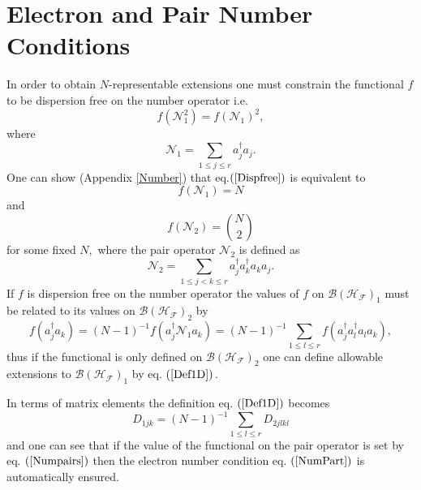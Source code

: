\documentclass[aps,preprint,amsfonts,amssymb,showpacs,showkeys]{revtex4}%
\begin{document}
\section{Electron and Pair Number Conditions \label{PartPair}}

In order to obtain $N$-representable extensions one must constrain the
functional $f$ to be dispersion free on the number operator i.e.
\begin{equation}
f\left(  \mathcal{N}_{1}^{2}\right)  =f\left(  \mathcal{N}_{1}\right)  ^{2},
\label{Dispfree}%
\end{equation}
where
\begin{equation}
\mathcal{N}_{1}=\sum_{1\leq j\leq r}a_{j}^{\dagger}a_{j}.
\end{equation}
One can show (Appendix \ref{Number}) that eq.$\left(  \ref{Dispfree}\right)  $
is equivalent to
\begin{equation}
f\left(  \mathcal{N}_{1}\right)  =N \label{NumPart}%
\end{equation}
and
\begin{equation}
f\left(  \mathcal{N}_{2}\right)  =\binom{N}{2} \label{Numpairs}%
\end{equation}
for some fixed $N,$ where the pair operator $\mathcal{N}_{2}$ is defined as
\begin{equation}
\mathcal{N}_{2}=\sum_{1\leq j<k\leq r}a_{j}^{\dagger}a_{k}^{\dagger}a_{k}%
a_{j}.
\end{equation}
If $f$ is dispersion free on the number operator the values of $f$ on
$\mathcal{B}\left(  \mathcal{H}_{\mathcal{F}}\right)  _{1}$ must be related to
its values on $\mathcal{B}\left(  \mathcal{H}_{\mathcal{F}}\right)  _{2}$ by
\begin{equation}
f\left(  a_{j}^{\dagger}a_{k}\right)  =\left(  N-1\right)  ^{-1}f\left(
a_{j}^{\dagger}\mathcal{N}_{1}a_{k}\right)  =\left(  N-1\right)  ^{-1}%
\sum_{1\leq l\leq r}f\left(  a_{j}^{\dagger}a_{l}^{\dagger}a_{l}a_{k}\right)
, \label{Def1D}%
\end{equation}
thus if the functional is only defined on $\mathcal{B}\left(  \mathcal{H}%
_{\mathcal{F}}\right)  _{2}$ one can define allowable extensions to
$\mathcal{B}\left(  \mathcal{H}_{\mathcal{F}}\right)  _{1}$ by eq. $\left(
\ref{Def1D}\right)  .$

In terms of matrix elements the definition eq. $\left(  \ref{Def1D}\right)  $
becomes
\begin{equation}
D_{1jk}=\left(  N-1\right)  ^{-1}\sum_{1\leq l\leq r}D_{2jlkl}%
\end{equation}
and one can see that if the value of the functional on the pair operator is
set by eq. $\left(  \ref{Numpairs}\right)  $ then the electron number
condition eq. $\left(  \ref{NumPart}\right)  $ is automatically ensured.
\end{document}
